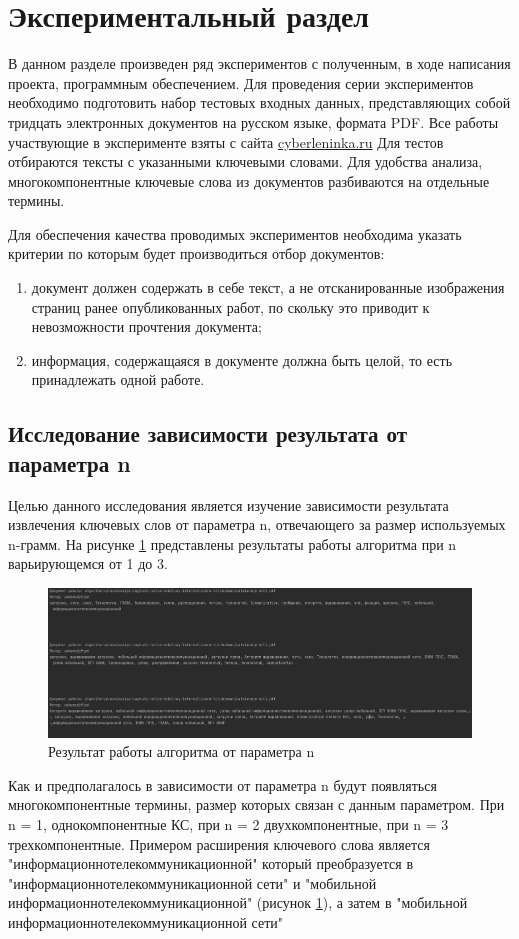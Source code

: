 \section{Экспериментальный раздел}
В данном разделе произведен ряд экспериментов с полученным, в ходе написания проекта, программным обеспечением.
Для проведения серии экспериментов необходимо подготовить набор тестовых входных данных, представляющих собой тридцать электронных документов на русском языке, формата PDF.
Все работы участвующие в эксперименте взяты с сайта \href{https://cyberleninka.ru/article}{cyberleninka.ru}
Для тестов отбираются тексты с указанными ключевыми словами.
Для удобства анализа, многокомпонентные ключевые слова из документов разбиваются на отдельные термины.

Для обеспечения качества проводимых экспериментов необходима указать критерии по которым будет производиться отбор документов:
\begin{enumerate}
	\item документ должен содержать в себе текст, а не отсканированные изображения страниц ранее опубликованных работ, по скольку это приводит к невозможности прочтения документа;
	\item информация, содержащаяся в документе должна быть целой, то есть принадлежать одной работе.
\end{enumerate}

\subsection{Исследование зависимости результата от параметра n}
Целью данного исследования является изучение зависимости результата извлечения ключевых слов от параметра n, отвечающего за размер используемых n-грамм.
На рисунке \ref{fig:experiment24} представлены результаты работы алгоритма при n варьирующемся от 1 до 3.

\begin{figure}[!h]
	\centering
	\includegraphics[width=1\linewidth]{src/img/experiment/experiment_2_4}
	\caption{Результат работы алгоритма от параметра n}
	\label{fig:experiment24}
\end{figure}
Как и предполагалось в зависимости от параметра n будут появляться многокомпонентные термины, размер которых связан с  данным параметром.
При n = 1, однокомпонентные КС, при n = 2 двухкомпонентные, при n = 3 трехкомпонентные.
Примером расширения ключевого слова является "информационнотелекоммуникационной" который преобразуется в "информационнотелекоммуникационной сети" и "мобильной информационнотелекоммуникационной" (рисунок \ref{fig:experiment24}), а затем в "мобильной информационнотелекоммуникационной сети"

